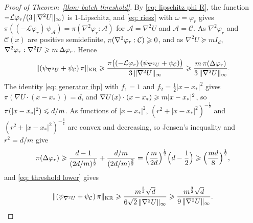 \begin{proof}[Proof of Theorem~\ref{thm: batch threshold}]
    By \eqref{eq: lipschitz phi R}, the function $-\mathcal L \varphi_r / (3\, \lVert \nabla^2 U \rVert_\infty)$ is $1$-Lipschitz, and \eqref{eq: riesz} with $\omega = \varphi_r$ gives $\pi((-\mathcal L \varphi_r)\, \psi_{\mathcal A}) = \pi(\nabla^2 \varphi_r : \mathcal A)$ for $\mathcal A = \nabla^2 U$ and $\mathcal A = \mathcal C$. As $\nabla^2 \varphi_r$ and $\mathcal C(x)$ are positive semidefinite, $\pi(\nabla^2 \varphi_r : \mathcal C) \geqslant 0$, and as $\nabla^2 U \succeq m I_d$, $\nabla^2 \varphi_r : \nabla^2 U \geqslant m\, \Delta \varphi_r$. Hence
    \begin{equation}
        \lVert ( \psi_{\nabla^2 U} + \psi_{\mathcal C} )\, \pi \rVert_{\mathrm{KR}} \geqslant \frac{\pi\bigl( (-\mathcal L \varphi_r)\, ( \psi_{\nabla^2 U} + \psi_{\mathcal C} ) \bigr)}{3\, \lVert \nabla^2 U \rVert_\infty} \geqslant \frac{m\, \pi( \Delta \varphi_r )}{3\, \lVert \nabla^2 U \rVert_\infty} .
        \label{eq: threshold lower}
    \end{equation}
    The identity \eqref{eq: generator ibp} with $f_1 = 1$ and $f_2 = \frac12 |x - x_*|^2$ gives $\pi(\nabla U \cdot (x - x_*)) = d$, and $\nabla U(x) \cdot (x - x_*) \geqslant m |x - x_*|^2$, so $\pi(|x - x_*|^2) \leqslant d/m$. As functions of $|x - x_*|^2$, $(r^2 + |x - x_*|^2)^{-\frac12}$ and $(r^2 + |x - x_*|^2)^{-\frac32}$ are convex and decreasing, so Jensen's inequality and $r^2 = d/m$ give
    \begin{equation*}
        \pi( \Delta \varphi_r ) \geqslant \frac{d-1}{(2d/m)^{\frac12}} + \frac{d/m}{(2d/m)^{\frac32}} = \Bigl( \frac{m}{2d} \Bigr)^{\frac12} \Bigl( d - \frac12 \Bigr) \geqslant \Bigl( \frac{m d}{8} \Bigr)^{\frac12} ,
    \end{equation*}
    and \eqref{eq: threshold lower} gives
    \begin{equation}
        \lVert ( \psi_{\nabla^2 U} + \psi_{\mathcal C} )\, \pi \rVert_{\mathrm{KR}} \geqslant \frac{m^{\frac32} \sqrt d}{6 \sqrt2\, \lVert \nabla^2 U \rVert_\infty} \geqslant \frac{m^{\frac32} \sqrt d}{9\, \lVert \nabla^2 U \rVert_\infty} .
        \label{eq: threshold lower explicit}
    \end{equation}


\end{proof}
